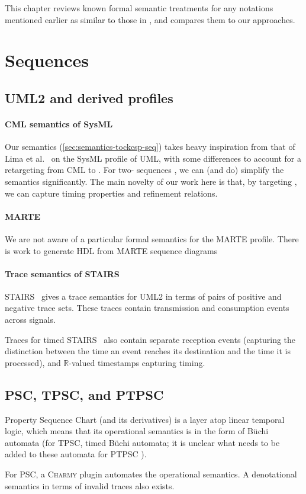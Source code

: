 
This chapter reviews known formal semantic treatments for any notations
mentioned earlier as similar to those in \langname, and compares them to
our approaches.

\section{Sequences}\label{sec:semantics-review-seq}

\subsection{UML2 and derived profiles}

\paragraph{CML semantics of SysML}

Our semantics (\cref{sec:semantics-tockcsp-seq}) takes heavy inspiration from
that of Lima et al.~\cite{lima-semantics} on the SysML profile of UML, with
some differences to account for a retargeting from CML to \tockcsp.  For
two-\mactor{} sequences , we can (and do)
simplify the semantics significantly.
The main novelty of our work here is that, by targeting \tockcsp, we can capture
timing properties and refinement relations.

\paragraph{MARTE}

We are not aware of a particular formal semantics for the MARTE profile.
There is work to generate HDL from MARTE sequence diagrams~

\paragraph{Trace semantics of STAIRS}

STAIRS~\cite{Haugen03-STAIRS} gives a trace semantics for UML2 in terms
of pairs of positive and negative trace sets.  These traces contain
transmission and consumption events across signals.

Traces for timed
STAIRS~\cite{Haugen05-TimedSTAIRS} also contain separate reception
events (capturing the distinction between the time an event reaches
its destination and the time it is processed), and \(\mathbb R\)-valued
timestamps capturing timing.

\subsection{PSC, TPSC, and PTPSC}

Property Sequence Chart (and its derivatives) is a layer atop
linear temporal logic, which means that its operational semantics is
in the form of B\"uchi automata (for TPSC, timed B\"uchi
automata; it is unclear what needs to be added to these automata for PTPSC ).

For PSC, a \textsc{Charmy} plugin automates the operational semantics.  A denotational semantics in terms of
invalid traces also exists.